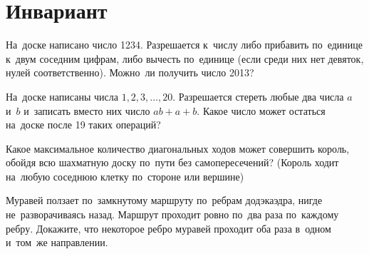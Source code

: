 
\section*{Инвариант}


\begin{problems}

\item
На~доске написано число 1234.
Разрешается к~числу либо прибавить по~единице к~двум соседним цифрам, либо
вычесть по~единице (если среди них нет девяток, нулей соответственно).
Можно~ли получить число 2013?

\item
На~доске написаны числа $1, 2, 3, \ldots, 20$.
Разрешается стереть любые два числа $a$ и~$b$ и~записать вместо них
число $ab + a + b$.
Какое число может остаться на~доске после 19 таких операций?

\item
Какое максимальное количество диагональных ходов может совершить король, обойдя
всю шахматную доску по~пути без самопересечений?
(Король ходит на~любую соседнюю клетку по~стороне или вершине)

\item
Муравей ползает по~замкнутому маршруту по~ребрам додэкаэдра, нигде
не~разворачиваясь назад.
Маршрут проходит ровно по~два раза по~каждому ребру.
Докажите, что некоторое ребро муравей проходит оба раза в~одном и~том~же
направлении.

\end{problems}

